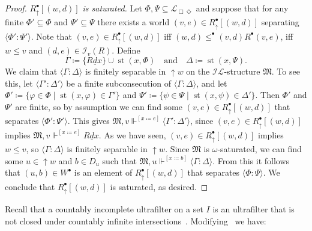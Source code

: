 \documentclass[submission,copyright,creativecommons]{eptcs}
\newcommand{\mo}{\mathfrak}
\renewcommand{\phi}{\varphi}
\newcommand{\und}{\underline}
\DeclareMathOperator{\st}{st}
\newcommand{\II}{\mathscr{I}}
\newcommand{\IL}{\mathscr{I\!\!L}}   %
\newcommand{\ML}{\mathcal{L}_{\Box\Diamond}}        %
\newcommand{\consec}[2]{\langle #1:#2 \rangle}
\newcommand{\satisfySym}{\Vdash}
\newcommand{\satisfy}[4]{#1, #2 \satisfySym^{#4} #3}
\begin{document}
\begin{proof}
  \medskip\noindent
  \textit{$R^\bullet_{\uparrow}[(w,d)]$ is saturated.}
    Let $\Phi, \Psi \subseteq \ML$ and suppose that for any finite
    $\Phi' \subseteq \Phi$ and $\Psi' \subseteq \Psi$ there exists a world
    $(v, e) \in R^\bullet_{\uparrow}[(w, d)]$ 
    separating $\consec{\Phi'}{\Psi'}$.
    Note that $(v, e) \in R^{\bullet}_{\uparrow}[(w, d)]$ iff
    $(w, d) \leq^{\bullet} (v, d) R^{\bullet} (v, e)$,
    iff $w \leq v$ and $(d, e) \in \II_v(R)$.
    Define
    \begin{equation*}
      \Gamma \coloneq \{R\und{d}x\} \cup \st(x, \Phi)
      \quad\text{and}\quad \Delta \coloneq \st(x, \Psi).
    \end{equation*}
    We claim that $\consec{\Gamma}{\Delta}$ is finitely separable in
    ${\uparrow}w$ on the $\IL$-structure $\mo{M}$.
%
    To see this, let $\consec{\Gamma'}{\Delta'}$ be a finite subconsecution of $\consec{\Gamma}{\Delta}$,
    and let $\Phi' \coloneq \{ \phi \in \Phi \mid \st(x, \phi) \in \Gamma' \}$
    and $\Psi' \coloneq \{ \psi \in \Psi \mid \st(x, \psi) \in \Delta' \}$.
     Then $\Phi'$ and $\Psi'$ are finite, so by assumption we can find some
    $(v, e) \in R^\bullet_{\uparrow}[(w, d)]$ that separates $\consec{\Phi'}{\Psi'}$.
%
    This gives $\satisfy{\mo{M}}{v}{\consec{\Gamma'}{\Delta'}}{[x \coloneq e]}$, since $(v, e) \in R^\bullet_{\uparrow}[(w, d)]$ implies $\satisfy{\mo{M}}{v}{R\und{d}x}{[x\coloneq e]}$.
    As we have seen, $(v, e) \in R^\bullet_{\uparrow}[(w, d)]$
    implies $w \leq v$,
    so $\consec{\Gamma}{\Delta}$ is finitely separable in ${\uparrow}w$.
%
    Since $\mo{M}$ is $\omega$-saturated, we can find some $u \in {\uparrow}w$
    and $b \in D_u$ such that $\satisfy{\mo{M}}{u}{\consec{\Gamma}{\Delta}}{[x\coloneq b]}$.
    From this it follows that $(u, b) \in W^{\bullet}$ is an element of $R^\bullet_{\uparrow}[(w,d)]$ that separates $\consec{\Phi}{\Psi}$.
    We conclude that $R^\bullet_{\uparrow}[(w, d)]$ is saturated, as desired.
\end{proof}

  Recall that a countably incomplete ultrafilter on a set $I$ is an ultrafilter
  that is not closed under countably infinite
  intersections~\cite[Propositions~4.3.4 and~4.3.5]{ChaKei73}.
  Modifying~\cite[Theorem~6.1.1]{ChaKei73} we have:
\end{document}
